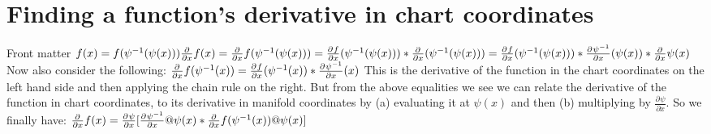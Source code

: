 \documentclass[18pt]{extarticle}
\newcommand*{\pd}[3][]{\ensuremath{\frac{\partial^{#1} #2}{\partial #3}}}
\begin{document}
\section{Finding a function's derivative in chart coordinates}
Front matter
$
\\ f(x) = f(\psi^{-1}(\psi(x)))
%
\\ \frac{\partial}{\partial x} f(x) =
\frac{\partial }{\partial x} 
f(\psi^{-1}(\psi(x)))
%
\\ =\pd{f}{x}(\psi^{-1}(\psi(x))) *
\pd{}{x}(\psi^{-1}(\psi(x))) 
%
\\ =\pd{f}{x}(\psi^{-1}(\psi(x))) *
\pd{\psi^{-1}}{x}(\psi(x)) *
\pd{}{x}\psi(x)
\\ $
\newline
Now also consider the following:
\newline
$
\\ \pd{}{x}f(\psi^{-1}(x)) =
\pd{f}{x}(\psi^{-1}(x)) *
\pd{\psi^{-1}}{x}(x)
$
\newline
\newline
This is the derivative of the function in the chart coordinates on the left hand side and then applying the chain rule on the right.
\newline 
But from the above equalities we see we can relate
the derivative of the function in chart coordinates, to its derivative in manifold coordinates by (a) evaluating it at $\psi(x)$ and then (b) multiplying by $\pd{\psi}{x}$.
\newline 
\newline
So we finally have:
\newline
$
\\ \pd{}{x}f(x) = \pd{\psi}{x}[
\pd{\psi^{-1}}{x}@\psi(x) * 
\pd{}{x}f(\psi^{-1}(x)) @ \psi(x)]
$
\end{document}
